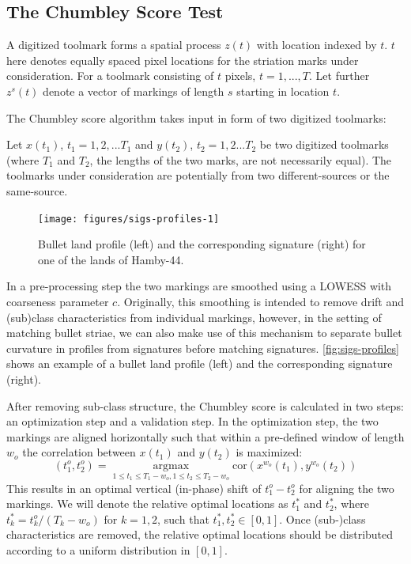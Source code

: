 \documentclass[12pt]{article}
\begin{document}
\hypertarget{the-chumbley-score-test}{%
\subsection{The Chumbley Score Test}\label{the-chumbley-score-test}}

A digitized toolmark forms a spatial process \(z(t)\) with location
indexed by \(t\). \(t\) here denotes equally spaced pixel locations for
the striation marks under consideration. For a toolmark consisting of
\(t\) pixels, \(t = 1, ..., T\). Let further \(z^s(t)\) denote a vector
of markings of length \(s\) starting in location \(t\).

The Chumbley score algorithm takes input in form of two digitized
toolmarks:

Let \(x(t_1)\), \(t_1 = 1,2,...T_1\) and \(y(t_2)\), \(t_2 = 1,2...T_2\)
be two digitized toolmarks (where \(T_1\) and \(T_2\), the lengths of
the two marks, are not necessarily equal). The toolmarks under
consideration are potentially from two different-sources or the
same-source.

\begin{figure}

{\centering \texttt{[image: figures/sigs-profiles-1]} 

}

\caption{Bullet land profile (left) and the corresponding signature (right) for one of the lands of Hamby-44.}\label{fig:sigs-profiles}
\end{figure}

In a pre-processing step the two markings are smoothed using a LOWESS
\citep{lowess} with coarseness parameter \(c\). Originally, this
smoothing is intended to remove drift and (sub)class characteristics
from individual markings, however, in the setting of matching bullet
striae, we can also make use of this mechanism to separate bullet
curvature in profiles from signatures before matching signatures.
\autoref{fig:sigs-profiles} shows an example of a bullet land profile
(left) and the corresponding signature (right).

After removing sub-class structure, the Chumbley score is calculated in
two steps: an optimization step and a validation step. In the
optimization step, the two markings are aligned horizontally such that
within a pre-defined window of length \(w_o\) the correlation between
\(x(t_1)\) and \(y(t_2)\) is maximized: \[
\left(t_1^o, t_2^o\right) = \mathop{\arg \max}\limits_{1 \le t_1 \le T_1-w_o, 1 \le t_2 \le T_2-w_o} \text{cor} \left(x^{w_o} (t_1), y^{w_o}(t_2) \right)
\] This results in an optimal vertical (in-phase) shift of
\(t_1^o - t_2^o\) for aligning the two markings. We will denote the
relative optimal locations as \(t_1^*\) and \(t_2^*\), where
\(t_k^* = t_k^o/(T_k-w_o)\) for \(k=1,2\), such that
\(t_1^*, t_2^* \in [0,1]\). Once (sub-)class characteristics are
removed, the relative optimal locations should be distributed according
to a uniform distribution in \([0,1]\).
\end{document}
